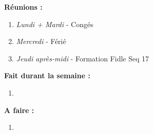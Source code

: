 \textbf{Réunions :}
\begin{enumerate}[label=\textbullet]
	\item \textit{Lundi + Mardi} - Congés
	\item \textit{Mercredi} - Férié
	\item \textit{Jeudi après-midi} - Formation Fidle Seq 17
\end{enumerate}
\textbf{Fait durant la semaine :}
\begin{enumerate}[label=\textbullet]
	\item 
\end{enumerate}
\textbf{A faire :}
\begin{enumerate}[label=\textbullet]
	\item 
\end{enumerate}